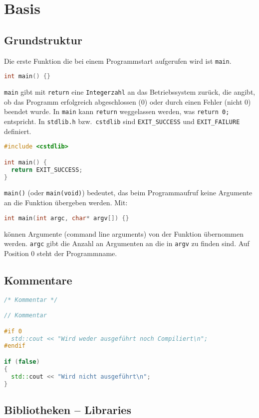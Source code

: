\section{Basis}
\label{sec:einleitung}

\subsection{Grundstruktur}

Die erste Funktion die bei einem Programmstart aufgerufen wird ist
\lstinline|main|.
\begin{lstlisting}[language=C++]
int main() {}
\end{lstlisting}
\lstinline|main| gibt mit \lstinline|return| eine \lstinline|Integerzahl| an das
Betriebssystem zurück, die angibt, ob das Programm erfolgreich abgeschlossen (0)
oder durch einen Fehler (nicht 0) beendet wurde. In \lstinline|main| kann
\lstinline|return| weggelassen werden, was \lstinline|return 0;| entspricht. In
\lstinline|stdlib.h| bzw.\ \lstinline|cstdlib| sind \lstinline|EXIT_SUCCESS| und
\lstinline|EXIT_FAILURE| definiert.
\begin{lstlisting}[language=C++]
#include <cstdlib>

int main() {
  return EXIT_SUCCESS;
}
\end{lstlisting}
\lstinline|main()| (oder \lstinline|main(void)|) bedeutet, das beim
Programmaufruf keine Argumente an die Funktion übergeben werden. Mit:
\begin{lstlisting}[language=C++]
int main(int argc, char* argv[]) {}
\end{lstlisting}
können Argumente (command line arguments) von der Funktion übernommen werden.
\lstinline|argc| gibt die Anzahl an Argumenten an die in \lstinline|argv| zu
finden sind. Auf Position 0 steht der Programmname.

\subsection{Kommentare}

\begin{lstlisting}[language=C++]
/* Kommentar */

// Kommentar

#if 0
  std::cout << "Wird weder ausgeführt noch Compiliert\n";
#endif

if (false)
{
  std::cout << "Wird nicht ausgeführt\n";
}
\end{lstlisting}

\subsection{Bibliotheken -- Libraries}

